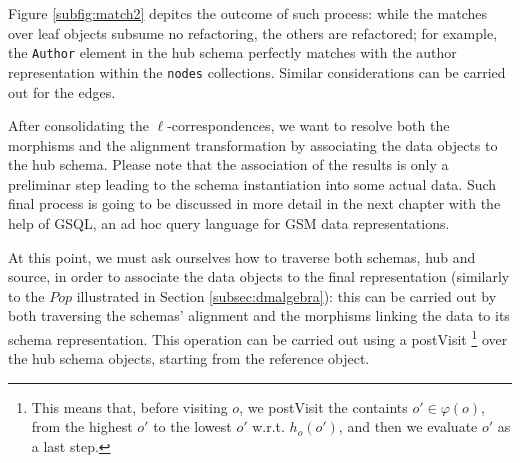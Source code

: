 \begin{example}[continues=ex:examplegraphdata,label=ex:examplereferencedOcaml]
\begin{itemize}
\end{itemize}
Figure \ref{subfig:match2} depitcs the outcome of such process: while the matches over leaf objects subsume no refactoring, the others are refactored; for example, the \texttt{Author} element in the hub schema perfectly matches with the author representation within the \texttt{nodes} collections. Similar considerations can be carried out for the edges.

After consolidating the $\ell$-correspondences, we want to resolve both the morphisms and the alignment transformation by associating the data objects to the hub schema. Please note that the association of the results is only a preliminar step leading to the schema instantiation into some actual data. Such final process  { is going to be discussed in more detail in the next chapter with the help of GSQL, an ad hoc query language for GSM data representations}. 

At this point, we must ask ourselves how to traverse both schemas,  hub and source, in order to associate the data objects to the final representation (similarly to the $Pop$ illustrated in Section \vref{subsec:dmalgebra}): this can be carried out by both traversing the schemas' alignment and the morphisms linking the data to its schema representation. This operation can be carried out using a postVisit \footnote{This means that, before visiting $o$, we postVisit the containts $o'\in\varphi(o)$, from the highest $o'$ to the lowest $o'$ w.r.t. $h_o(o')$, and then we evaluate $o'$ as a last step.} over the hub schema objects, starting from the reference object. 


\end{example}
